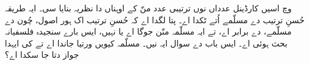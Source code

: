 \documentclass[../../../include/open-logic-section]{subfiles}
\begin{document}


 وچ اسیں کارڈینل عدداں نوں ترتیبی عدد منّ کے اوہناں دا نظریہ بنایا سی۔ ایہ طریقہ حُسنِ ترتیب دے مسلّمے اُتے ٹکدا اے۔ پتا لگدا اے کہ حُسنِ ترتیب اک ہور اصول، چُون دے مسلّمے، دے برابر اے، تے ایہ مسلّمہ منّن جوگا اے یا نہیں، ایس بارے سنجیدہ فلسفیانہ بحث ہوئی اے۔ ایس باب دے سوال ایہ نیں۔ مسلّمہ کیویں ورتیا جاندا اے تے کی ایہدا جواز دتا جا سکدا اے؟
\end{document}
